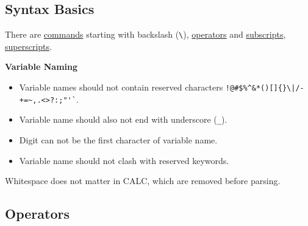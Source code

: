 \subsection{Syntax Basics}\label{d:subsec:CALC_syntax_basics}
There are \hyperref[d:subsec:CALC_cmd]{commands} starting with backslash (\texttt{\textbackslash}\indextt{\textbackslash}),
\hyperref[d:subsec:CALC_oper]{operators} and \hyperref[d:subsec:CALC_sub]{subscripts}, \hyperref[d:subsec:CALC_super]{superscripts}.
\begin{warning}
  \textbf{Variable Naming}
  \begin{itemize}
    \item Variable names should not contain reserved characters \verb`!@#$%^&*()[]{}\|/-+=~,.<>?:;"'`\verb|`|.
    \item Variable name should also not end with underscore (\verb`_`).
    \item Digit can not be the first character of variable name.
    \item Variable name should not clash with reserved keywords.
  \end{itemize}
\end{warning}
\begin{remark}
  Whitespace does not matter in CALC, which are removed before parsing.
\end{remark}

\subsection{Operators}\label{d:subsec:CALC_oper}

